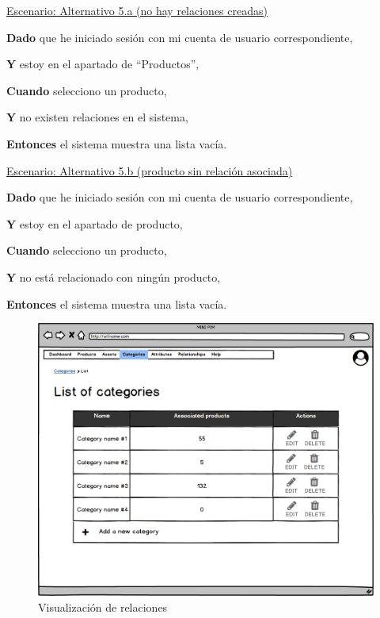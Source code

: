 \vspace{0.20cm}

\underline{Escenario: Alternativo 5.a (no hay relaciones creadas)}\par
\vspace{0.15cm}
\textbf{Dado} que he iniciado sesión con mi cuenta de usuario correspondiente,\par
\textbf{Y} estoy en el apartado de \enquote{Productos},\par
\textbf{Cuando} selecciono un producto,\par
\textbf{Y} no existen relaciones en el sistema,\par
\textbf{Entonces} el sistema muestra una lista vacía.\par

\vspace{0.20cm}

\underline{Escenario: Alternativo 5.b (producto sin relación asociada)}\par
\vspace{0.15cm}
\textbf{Dado} que he iniciado sesión con mi cuenta de usuario correspondiente,\par
\textbf{Y} estoy en el apartado de producto,\par
\textbf{Cuando} selecciono un producto,\par
\textbf{Y} no está relacionado con ningún producto,\par
\textbf{Entonces} el sistema muestra una lista vacía.\par

\vspace{0.20cm}

\begin{figure}[H]
    \includegraphics[width=1\linewidth]{assets/mockups/RF4.2_1.png}
    \caption{Visualización de relaciones}
   \end{figure}
\vspace{1.0cm}

